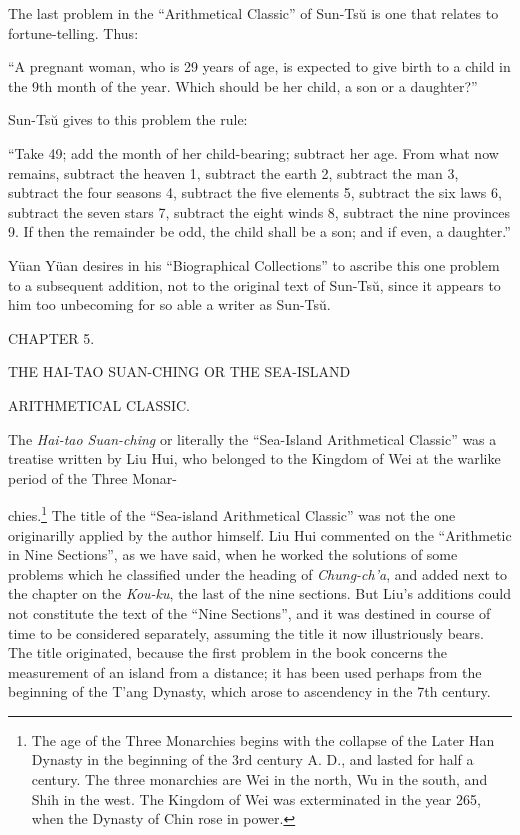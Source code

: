 \documentclass[11pt]{article}
\newcommand{\scanpage}[2]{\clearpage\setcounter{footnote}{0}\noindent{\footnotesize\color{gray}PDF page #1 · #2}\par\medskip}
\newcommand{\scanfooter}{}
\begin{document}
The last problem in the ``Arithmetical Classic'' of Sun-Tsŭ is one that relates to fortune-telling. Thus:

``A pregnant woman, who is 29 years of age, is expected to give birth to a child in the 9th month of the year. Which should be her child, a son or a daughter?''

Sun-Tsŭ gives to this problem the rule:

``Take 49; add the month of her child-bearing; subtract her age. From what now remains, subtract the heaven 1, subtract the earth 2, subtract the man 3, subtract the four seasons 4, subtract the five elements 5, subtract the six laws 6, subtract the seven stars 7, subtract the eight winds 8, subtract the nine provinces 9. If then the remainder be odd, the child shall be a son; and if even, a daughter.''

Yüan Yüan desires in his ``Biographical Collections'' to ascribe this one problem to a subsequent addition, not to the original text of Sun-Tsŭ, since it appears to him too unbecoming for so able a writer as Sun-Tsŭ.

\begin{center}
CHAPTER 5.\par
\medskip
THE HAI-TAO SUAN-CHING OR THE SEA-ISLAND\par
ARITHMETICAL CLASSIC.
\end{center}

The \emph{Hai-tao Suan-ching} or literally the ``Sea-Island Arithmetical Classic'' was a treatise written by Liu Hui, who belonged to the Kingdom of Wei at the warlike period of the Three Monar-

\scanfooter

\scanpage{0048}{Part I, printed page 34}

chies.\footnote{The age of the Three Monarchies begins with the collapse of the Later Han Dynasty in the beginning of the 3rd century A. D., and lasted for half a century. The three monarchies are Wei in the north, Wu in the south, and Shih in the west. The Kingdom of Wei was exterminated in the year 265, when the Dynasty of Chin rose in power.} The title of the ``Sea-island Arithmetical Classic'' was not the one originarilly applied by the author himself. Liu Hui commented on the ``Arithmetic in Nine Sections'', as we have said, when he worked the solutions of some problems which he classified under the heading of \emph{Chung-ch'a}, and added next to the chapter on the \emph{Kou-ku}, the last of the nine sections. But Liu's additions could not constitute the text of the ``Nine Sections'', and it was destined in course of time to be considered separately, assuming the title it now illustriously bears. The title originated, because the first problem in the book concerns the measurement of an island from a distance; it has been used perhaps from the beginning of the T'ang Dynasty, which arose to ascendency in the 7th century.
\end{document}
